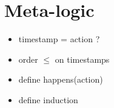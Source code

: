 \section{Meta-logic}

\begin{itemize}
  \item timestamp = action ?
  \item order $\leq$ on timestamps
  \item define happens(action)
  \item define induction
\end{itemize}
